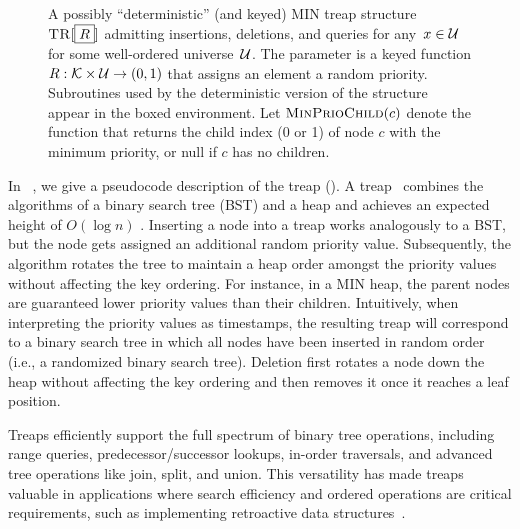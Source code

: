 \begin{figure*}[thp]
\begin{pchstack}[boxed,center,space=0.5em]
\begin{pcvstack}[space=0.45em]
{                }
        \end{pcvstack}	
    \end{pchstack}
    \caption[Treap Structure.]{A possibly ``deterministic'' (and keyed) MIN treap structure $\textnormal{\textsc{TR}}[\boxed{R}]$ admitting insertions, deletions, and queries for any~$x \in \mathcal{U}$ for some well-ordered universe~$\mathcal{U}$. The parameter is a keyed function $R: \mathcal{K} \times \mathcal{U} \to (0,1)$ that assigns an element a random priority. Subroutines used by the deterministic version of the structure appear in the boxed environment. Let $\textnormal{\textsc{MinPrioChild}}(c)$ denote the function that returns the child index (0 or 1) of node $c$ with the minimum priority, or null if $c$ has no children.} 
    \label{fig:treap}
\end{figure*}

In~ , we give a pseudocode description of the treap (\TR).
A treap~\cite{aragon1989randomized} combines the algorithms of a binary search tree (BST) and a heap and achieves an expected height of $O(\log n)$ \cite{aragon1989randomized}.
Inserting a node into a treap works analogously to a BST, but the node gets assigned an additional random priority value.
Subsequently, the algorithm rotates the tree to maintain a heap order amongst the priority values without affecting the key ordering.
For instance, in a MIN heap, the parent nodes are guaranteed lower priority values than their children.
Intuitively, when interpreting the priority values as timestamps, the resulting treap will correspond to a binary search tree in which all nodes have been inserted in random order (i.e., a randomized binary search tree). 
Deletion first rotates a node down the heap without affecting the key ordering and then removes it once it reaches a leaf position. 

Treaps efficiently support the full spectrum of binary tree operations, including range queries, predecessor/successor lookups, in-order traversals, and advanced tree operations like join, split, and union. This versatility has made treaps valuable in applications where search efficiency and ordered operations are critical requirements, such as implementing retroactive data structures~\cite{demaine2007retroactive}.